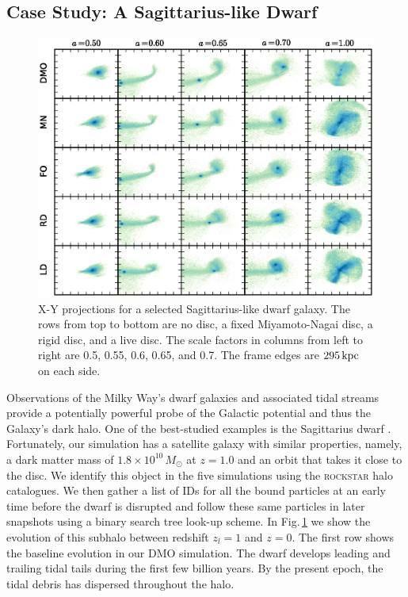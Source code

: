 \subsection{Case Study: A Sagittarius-like Dwarf}

\begin{figure} \centering
\includegraphics[width=\textwidth]{../figures/streams_side_by_side_five_sims}
\caption{X-Y projections for a selected Sagittarius-like dwarf galaxy. The
  rows from top to bottom are no disc, a fixed Miyamoto-Nagai disc, a
  rigid disc, and a live disc. The scale factors in columns from left
  to right are 0.5, 0.55, 0.6, 0.65, and 0.7. The frame edges are
  $295\,{\rm kpc}$ on each side.}\label{fig:streams}
\end{figure}

Observations of the Milky Way's dwarf galaxies and associated tidal
streams provide a potentially powerful probe of the Galactic potential
and thus the Galaxy's dark halo.  One of the best-studied examples is
the Sagittarius dwarf \citet{ibatadiscovery}.  Fortunately, our
simulation has a satellite galaxy with similar properties, namely, a
dark matter mass of $1.8 \times 10^{10} \, M_\odot$ at
$z=1.0$ and an orbit that takes it close to the disc.  We identify
this object in the five simulations using the \textsc{rockstar}
halo catalogues.  We then gather a list of IDs for all the
bound particles at an early time before the dwarf is disrupted and
follow these same particles in later snapshots using a binary
search tree look-up scheme.  In Fig.\,\ref{fig:streams} we show the
evolution of this subhalo between redshift $z_l=1$ and $z=0$. The
first row shows the baseline evolution in our
DMO simulation.  The dwarf develops leading and trailing tidal tails
during the first few billion years.  By the present epoch, the tidal
debris has dispersed throughout the halo.

